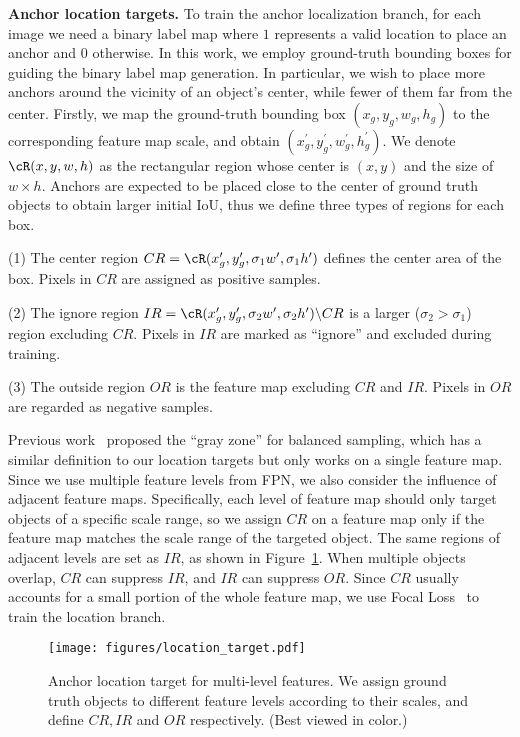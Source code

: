 \documentclass[10pt,twocolumn,letterpaper]{article}
\begin{document}
\noindent
\textbf{Anchor location targets.}
To train the anchor localization branch, for each image we need a binary label map where $1$ represents a valid location to place an anchor and $0$ otherwise.
In this work, we employ ground-truth bounding boxes for guiding the binary label map generation.
In particular, we wish to place more anchors around the vicinity of an object's center, while fewer of them far from the center.
Firstly, we map the ground-truth bounding box $(x_g, y_g, w_g, h_g)$ to the
corresponding feature map scale, and obtain $(x_g^\prime, y_g^\prime, w_g^\prime, h_g^\prime)$.
We denote $\cR(x, y, w, h)$ as the rectangular region whose center is
$(x, y)$ and the size of $w\times h$.
Anchors are expected to be placed close to the center of ground truth objects to obtain larger initial IoU, thus we define three types of regions for each box.

\noindent
(1) The center region $CR=\cR(x_g^\prime,y_g^\prime,\sigma_1w^\prime, \sigma_1h^\prime)$
defines the center area of the box. Pixels in $CR$ are assigned as positive samples.


\noindent
(2) The ignore region $IR=\cR(x_g^\prime,y_g^\prime,\sigma_2w^\prime, \sigma_2h^\prime)\backslash CR$
is a larger ($\sigma_2>\sigma_1$) region excluding $CR$. Pixels in $IR$ are marked as ``ignore'' and excluded during training.


\noindent
(3) The outside region $OR$ is the feature map excluding $CR$ and $IR$.
Pixels in $OR$ are regarded as negative samples.


Previous work~\cite{huang2015densebox} proposed the ``gray zone'' for balanced sampling,
which has a similar definition to our location targets but only works on a single feature map.
Since we use multiple feature levels from FPN, we also consider the influence
of adjacent feature maps.
Specifically, each level of feature map should only target objects of a specific scale range,
so we assign $CR$ on a feature map only if the feature map matches the scale
range of the targeted object.
The same regions of adjacent levels are set as $IR$, as shown in Figure~\ref{fig:location-target}.
When multiple objects overlap, $CR$ can suppress $IR$, and $IR$ can suppress $OR$.
Since $CR$ usually accounts for a small portion of the whole feature map, we use Focal Loss~\cite{lin2017focal} to train the location branch.

\begin{figure}[t]
	\centering
	\texttt{[image: figures/location\_target.pdf]}
	\caption{\small{Anchor location target for multi-level features. We assign ground
		truth objects to different feature levels according to their scales, and
		define $CR, IR$ and $OR$ respectively. (Best viewed in color.)}}
	\label{fig:location-target}
	\vspace{-15pt}
\end{figure}
\end{document}
